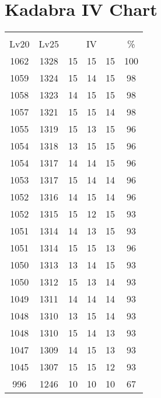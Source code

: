 \documentclass{article}%
\begin{document}
%
\normalsize%
\section{Kadabra IV Chart}%
\label{sec:Kadabra IV Chart}%
\renewcommand{\arraystretch}{1.5}%
\begin{tabular}{|c|c|c|c|c|c|}%
\hline%
\multicolumn{6}{|c|}{\textcolor{white}{ 
\linebreak{Kadabra}
}%
\cellcolor{black}}\\%
\multicolumn{1}{|c}{Lv20}&\multicolumn{1}{c|}{Lv25}&\multicolumn{3}{c|}{IV}&\multicolumn{1}{|c|}{\%}\\%
\hline%
\rowcolor{color100}%
1062&1328&15&15&15&100\\%
\hline%
\rowcolor{color98}%
1059&1324&15&14&15&98\\%
\hline%
\rowcolor{color98}%
1058&1323&14&15&15&98\\%
\hline%
\rowcolor{color98}%
1057&1321&15&15&14&98\\%
\hline%
\rowcolor{color96}%
1055&1319&15&13&15&96\\%
\hline%
\rowcolor{color96}%
1054&1318&13&15&15&96\\%
\hline%
\rowcolor{color96}%
1054&1317&14&14&15&96\\%
\hline%
\rowcolor{color96}%
1053&1317&15&14&14&96\\%
\hline%
\rowcolor{color96}%
1052&1316&14&15&14&96\\%
\hline%
\rowcolor{color93}%
1052&1315&15&12&15&93\\%
\hline%
\rowcolor{color93}%
1051&1314&14&13&15&93\\%
\hline%
\rowcolor{color96}%
1051&1314&15&15&13&96\\%
\hline%
\rowcolor{color93}%
1050&1313&13&14&15&93\\%
\hline%
\rowcolor{color93}%
1050&1312&15&13&14&93\\%
\hline%
\rowcolor{color93}%
1049&1311&14&14&14&93\\%
\hline%
\rowcolor{color93}%
1048&1310&13&15&14&93\\%
\hline%
\rowcolor{color93}%
1048&1310&15&14&13&93\\%
\hline%
\rowcolor{color93}%
1047&1309&14&15&13&93\\%
\hline%
\rowcolor{color93}%
1045&1307&15&15&12&93\\%
\hline%
\rowcolor{color91}%
996&1246&10&10&10&67\\%
\end{tabular}

%
\end{document}
